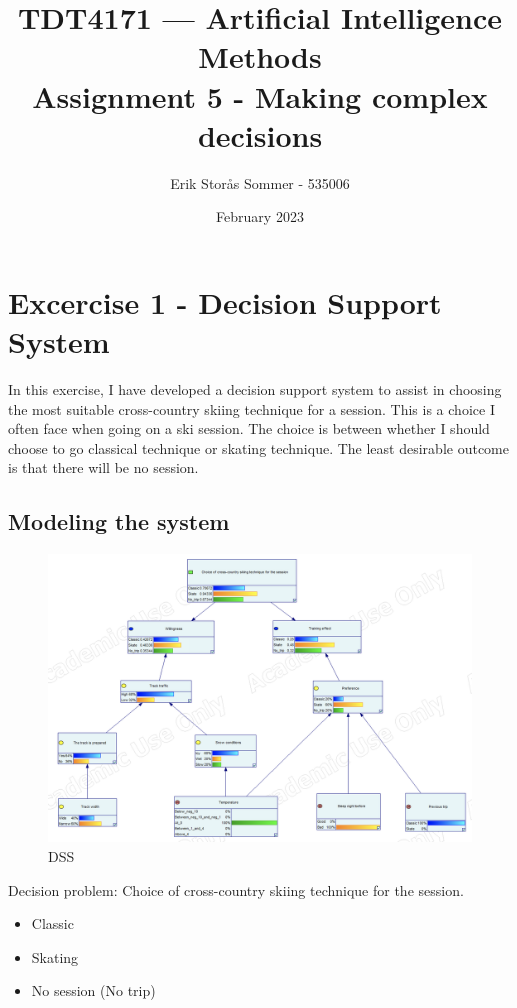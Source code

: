\documentclass{article}
\title{TDT4171 — Artificial Intelligence Methods \\ Assignment 5 - Making complex decisions}
\author{Erik Storås Sommer - 535006}
\date{February 2023}
\begin{document}
\maketitle
\setlength{\parindent}{0pt}

\section*{Excercise 1 - Decision Support System}

In this exercise, I have developed a decision support system to assist in choosing the most suitable cross-country skiing technique for a session.
This is a choice I often face when going on a ski session.
The choice is between whether I should choose to go classical technique or skating technique. The least desirable outcome is that there will be no session.

\subsection*{Modeling the system}

\begin{figure}[hbtp]
    \includegraphics[width=\linewidth]{main_model.png}
    \caption{DSS}
    \label{fig:image1}
\end{figure}

Decision problem: Choice of cross-country skiing technique for the session.
\begin{itemize}
    \item Classic
    \item Skating
    \item No session (No trip)
\end{itemize}
\end{document}
